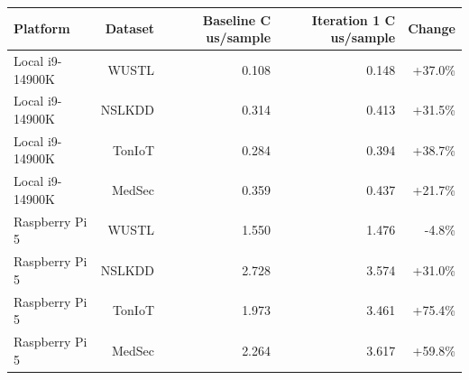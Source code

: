 \begin{tabular}{lrrrr}
\toprule
Platform & Dataset & Baseline C us/sample & Iteration 1 C us/sample & Change \\
\midrule
Local i9-14900K & WUSTL & 0.108 & 0.148 & +37.0\% \\
Local i9-14900K & NSLKDD & 0.314 & 0.413 & +31.5\% \\
Local i9-14900K & TonIoT & 0.284 & 0.394 & +38.7\% \\
Local i9-14900K & MedSec & 0.359 & 0.437 & +21.7\% \\
Raspberry Pi 5 & WUSTL & 1.550 & 1.476 & -4.8\% \\
Raspberry Pi 5 & NSLKDD & 2.728 & 3.574 & +31.0\% \\
Raspberry Pi 5 & TonIoT & 1.973 & 3.461 & +75.4\% \\
Raspberry Pi 5 & MedSec & 2.264 & 3.617 & +59.8\% \\
\bottomrule
\end{tabular}
